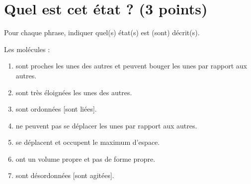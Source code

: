 
\section{Quel est cet état ? (3 points)}\label{ex:etat}



\begin{questions}
	\question[3] Pour chaque phrase, indiquer quel(s) état(s) est (sont) décrit(s).
	
	Les molécules :\\
	\begin{enumerate}
		\item sont proches les unes des autres et peuvent bouger les unes par rapport aux autres.
		
		\item sont très éloignées les unes des autres.
		
		\item sont ordonnées [sont liées].
		
		\item ne peuvent pas se déplacer les unes par rapport aux autres.
		
		\item se déplacent et occupent le maximum d'espace.
		
		\item ont un volume propre et pas de forme propre.
		
		\item sont désordonnées [sont agitées].
	\end{enumerate}
	
\end{questions}
